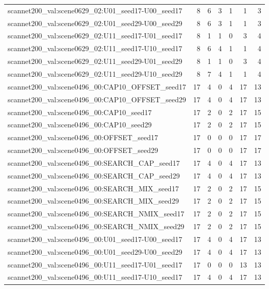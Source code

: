\begin{table}[t]
\begin{tabular}{lrrrrrr}
scannet200\_val:scene0629\_02:U01\_seed17-U00\_seed17 & 8 & 6 & 3 & 1 & 1 & 3 \\
scannet200\_val:scene0629\_02:U01\_seed29-U00\_seed29 & 8 & 6 & 3 & 1 & 1 & 3 \\
scannet200\_val:scene0629\_02:U11\_seed17-U01\_seed17 & 8 & 1 & 1 & 0 & 3 & 4 \\
scannet200\_val:scene0629\_02:U11\_seed17-U10\_seed17 & 8 & 6 & 4 & 1 & 1 & 4 \\
scannet200\_val:scene0629\_02:U11\_seed29-U01\_seed29 & 8 & 1 & 1 & 0 & 3 & 4 \\
scannet200\_val:scene0629\_02:U11\_seed29-U10\_seed29 & 8 & 7 & 4 & 1 & 1 & 4 \\
scannet200\_val:scene0496\_00:CAP10\_OFFSET\_seed17 & 17 & 4 & 0 & 4 & 17 & 13 \\
scannet200\_val:scene0496\_00:CAP10\_OFFSET\_seed29 & 17 & 4 & 0 & 4 & 17 & 13 \\
scannet200\_val:scene0496\_00:CAP10\_seed17 & 17 & 2 & 0 & 2 & 17 & 15 \\
scannet200\_val:scene0496\_00:CAP10\_seed29 & 17 & 2 & 0 & 2 & 17 & 15 \\
scannet200\_val:scene0496\_00:OFFSET\_seed17 & 17 & 0 & 0 & 0 & 17 & 17 \\
scannet200\_val:scene0496\_00:OFFSET\_seed29 & 17 & 0 & 0 & 0 & 17 & 17 \\
scannet200\_val:scene0496\_00:SEARCH\_CAP\_seed17 & 17 & 4 & 0 & 4 & 17 & 13 \\
scannet200\_val:scene0496\_00:SEARCH\_CAP\_seed29 & 17 & 4 & 0 & 4 & 17 & 13 \\
scannet200\_val:scene0496\_00:SEARCH\_MIX\_seed17 & 17 & 2 & 0 & 2 & 17 & 15 \\
scannet200\_val:scene0496\_00:SEARCH\_MIX\_seed29 & 17 & 2 & 0 & 2 & 17 & 15 \\
scannet200\_val:scene0496\_00:SEARCH\_NMIX\_seed17 & 17 & 2 & 0 & 2 & 17 & 15 \\
scannet200\_val:scene0496\_00:SEARCH\_NMIX\_seed29 & 17 & 2 & 0 & 2 & 17 & 15 \\
scannet200\_val:scene0496\_00:U01\_seed17-U00\_seed17 & 17 & 4 & 0 & 4 & 17 & 13 \\
scannet200\_val:scene0496\_00:U01\_seed29-U00\_seed29 & 17 & 4 & 0 & 4 & 17 & 13 \\
scannet200\_val:scene0496\_00:U11\_seed17-U01\_seed17 & 17 & 0 & 0 & 0 & 13 & 13 \\
scannet200\_val:scene0496\_00:U11\_seed17-U10\_seed17 & 17 & 4 & 0 & 4 & 17 & 13 \\

\end{tabular}
\end{table}
